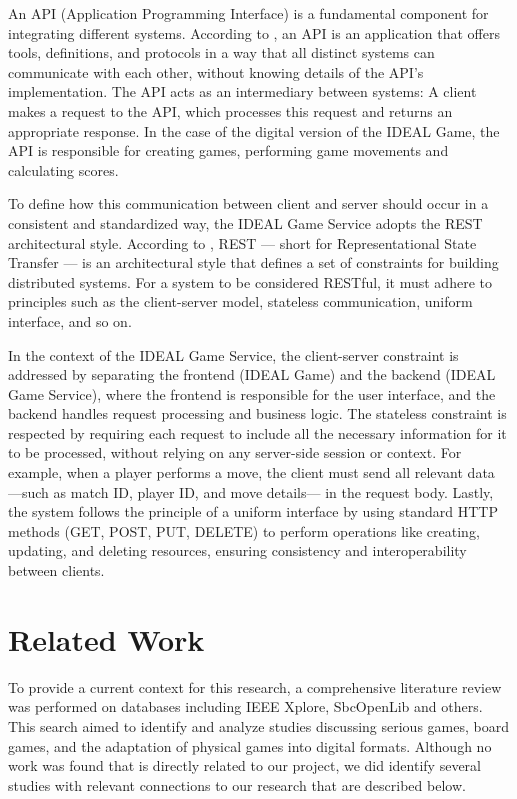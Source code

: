 \documentclass[english]{sbc2025}
\begin{document}
An API (Application Programming Interface) is a fundamental component for integrating different systems. According to \citep{redhat_api}, an API is an application that offers tools, definitions, and protocols in a way that all distinct systems can communicate with each other, without knowing details of the API’s implementation. The API acts as an intermediary between systems: A client makes a request to the API, which processes this request and returns an appropriate response. In the case of the digital version of the IDEAL Game, the API is responsible for creating games, performing game movements and calculating scores.

To define how this communication between client and server should occur in a consistent and standardized way, the IDEAL Game Service adopts the REST architectural style. According to \citep{fielding2000architectural}, REST — short for Representational State Transfer — is an architectural style that defines a set of constraints for building distributed systems. For a system to be considered RESTful, it must adhere to principles such as the client-server model, stateless communication, uniform interface, and so on. 

In the context of the IDEAL Game Service, the client-server constraint is addressed by separating the frontend (IDEAL Game) and the backend (IDEAL Game Service), where the frontend is responsible for the user interface, and the backend handles request processing and business logic. The stateless constraint is respected by requiring each request to include all the necessary information for it to be processed, without relying on any server-side session or context. For example, when a player performs a move, the client must send all relevant data —such as match ID, player ID, and move details— in the request body. Lastly, the system follows the principle of a uniform interface by using standard HTTP methods (GET, POST, PUT, DELETE) to perform operations like creating, updating, and deleting resources, ensuring consistency and interoperability between clients.

\section{Related Work}

To provide a current context for this research, a comprehensive literature review was performed on databases including IEEE Xplore, SbcOpenLib and others. This search aimed to identify and analyze studies discussing serious games, board games, and the adaptation of physical games into digital formats. Although no work was found that is directly related to our project, we did identify several studies with relevant connections to our research that are described below.
\end{document}
